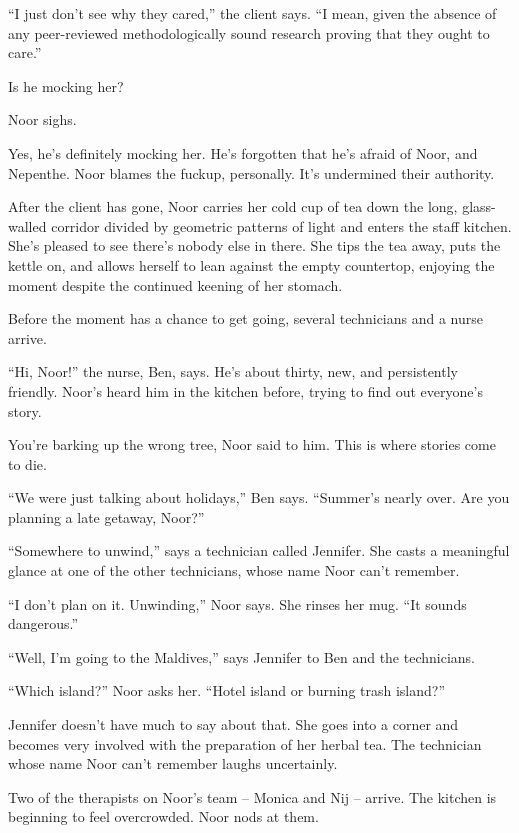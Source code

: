 \documentclass[12pt,a5paper]{book}
\newcommand{\qm}[1]{“#1”}
\newcommand{\storybreak}{%
  \par\vspace{0.6\baselineskip}
  \begin{center}\color{coveraccent}\small *\enspace *\enspace *\end{center}
  \vspace{0.3\baselineskip}\noindent\ignorespaces
}
\begin{document}
\qm{I just don't see why they cared,} the client says. \qm{I mean, given the absence of any peer-reviewed methodologically sound research proving that they ought to care.}

Is he mocking her?

Noor sighs.

Yes, he's definitely mocking her. He's forgotten that he's afraid of Noor, and Nepenthe. Noor blames the fuckup, personally. It's undermined their authority.

\storybreak

After the client has gone, Noor carries her cold cup of tea down the long, glass-walled corridor divided by geometric patterns of light and enters the staff kitchen. She's pleased to see there's nobody else in there. She tips the tea away, puts the kettle on, and allows herself to lean against the empty countertop, enjoying the moment despite the continued keening of her stomach.

Before the moment has a chance to get going, several technicians and a nurse arrive.

\qm{Hi, Noor!} the nurse, Ben, says. He's about thirty, new, and persistently friendly. Noor's heard him in the kitchen before, trying to find out everyone's story.

You're barking up the wrong tree, Noor said to him. This is where stories come to die.

\qm{We were just talking about holidays,} Ben says. \qm{Summer's nearly over. Are you planning a late getaway, Noor?}

\qm{Somewhere to unwind,} says a technician called Jennifer. She casts a meaningful glance at one of the other technicians, whose name Noor can't remember.

\qm{I don't plan on it. Unwinding,} Noor says. She rinses her mug. \qm{It sounds dangerous.}

\qm{Well, I'm going to the Maldives,} says Jennifer to Ben and the technicians.

\qm{Which island?} Noor asks her. \qm{Hotel island or burning trash island?}

Jennifer doesn't have much to say about that. She goes into a corner and becomes very involved with the preparation of her herbal tea. The technician whose name Noor can't remember laughs uncertainly.

Two of the therapists on Noor's team – Monica and Nij – arrive. The kitchen is beginning to feel overcrowded. Noor nods at them.
\end{document}
